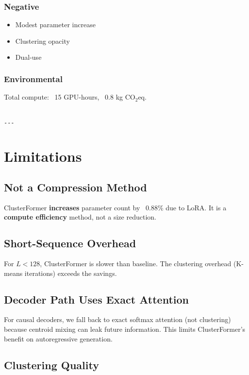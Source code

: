 \subsubsection{Negative}
\begin{itemize}
\item Modest parameter increase
\item Clustering opacity
\item Dual-use

\end{itemize}
\subsubsection{Environmental}
Total compute: ~15 GPU-hours, ~0.8 kg CO$_2$eq.
\begin{lstlisting}

---
\end{lstlisting}

\section{Limitations}

\subsection{Not a Compression Method}

ClusterFormer \textbf{increases} parameter count by ~0.88\% due to 
LoRA. It is a \textbf{compute efficiency} method, not a size reduction.

\subsection{Short-Sequence Overhead}

For $L < 128$, ClusterFormer is slower than baseline. The clustering 
overhead (K-means iterations) exceeds the savings.

\subsection{Decoder Path Uses Exact Attention}

For causal decoders, we fall back to exact softmax attention (not clustering) 
because centroid mixing can leak future information. This limits 
ClusterFormer's benefit on autoregressive generation.

\subsection{Clustering Quality}

